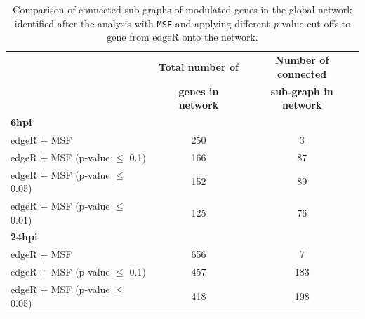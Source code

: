 \documentclass[10pt,a4paper,twocolumn]{article}
\begin{document}
	\begin{table}[]
		\centering
		\caption{Comparison of connected sub-graphs of modulated genes
			in the global network identified after the analysis with
			\texttt{MSF} and applying different \textit{p}-value cut-offs to gene from edgeR onto the network. }
		\label{tab:rawVsHartung}
		\begin{tabular}{lll}
			\hline
			\multicolumn{1}{|l|}{}                            & \multicolumn{1}{c|}{\textbf{Total number of}}       & \multicolumn{1}{c|}{\textbf{Number of connected}}      \\
			\multicolumn{1}{|l|}{}                            & \multicolumn{1}{c|}{\textbf{genes in network}}      & \multicolumn{1}{c|}{\textbf{sub-graph in network}}     \\ \hline
			\multicolumn{1}{|l|}{\textbf{6hpi}}               & \multicolumn{1}{l|}{}                                                & \multicolumn{1}{c|}{}                 \\ \hline
			\multicolumn{1}{|l|}{edgeR + MSF}                 & \multicolumn{1}{c|}{250}                                             & \multicolumn{1}{c|}{3}                \\ \hline
			\multicolumn{1}{|l|}{edgeR + MSF (p-value $\leq$ 0.1)}  & \multicolumn{1}{c|}{166}                                             & \multicolumn{1}{c|}{87}               \\ \hline
			\multicolumn{1}{|l|}{edgeR + MSF (p-value $\leq$ 0.05)} & \multicolumn{1}{c|}{152}                                             & \multicolumn{1}{c|}{89}               \\ \hline
			\multicolumn{1}{|l|}{edgeR + MSF (p-value $\leq$ 0.01)} & \multicolumn{1}{c|}{125}                                             & \multicolumn{1}{c|}{76}               \\ \hline
			\multicolumn{1}{|l|}{\textbf{24hpi}}              & \multicolumn{1}{c|}{}                                                & \multicolumn{1}{c|}{}                 \\ \hline
			\multicolumn{1}{|l|}{edgeR + MSF}                 & \multicolumn{1}{c|}{656}                                             & \multicolumn{1}{c|}{7}                \\ \hline
			\multicolumn{1}{|l|}{edgeR + MSF (p-value $\leq$ 0.1)}  & \multicolumn{1}{c|}{457}                                             & \multicolumn{1}{c|}{183}               \\ \hline
			\multicolumn{1}{|l|}{edgeR + MSF (p-value $\leq$ 0.05)} & \multicolumn{1}{c|}{418}                                             & \multicolumn{1}{c|}{198}              \\ \hline

\end{tabular}
\end{table}
\end{document}
